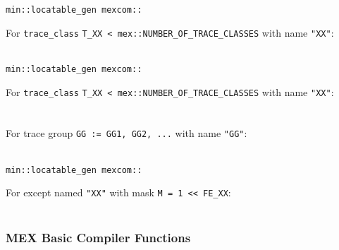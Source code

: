 \documentclass[12pt]{article}
\begin{document}
\verb|min::locatable_gen mexcom::| 
\begin{indpar}
For {\tt trace\_class} {\tt T\_XX < mex::NUMBER\_OF\_TRACE\_CLASSES}
with name {\tt "XX"}:\\
\hspace*{3em}{\tt ~~~min::get ( trace\_class\_table, new\_str\_gen ( "XX" ) )}
\\
\hspace*{3em}{\tt == new\_num\_gen ( T\_XX )}
\end{indpar}

\verb|min::locatable_gen mexcom::| 
\begin{indpar}
For {\tt trace\_class} {\tt T\_XX < mex::NUMBER\_OF\_TRACE\_CLASSES}
with name {\tt "XX"}:\\
\hspace*{3em}{\tt ~~~min::get ( trace\_class\_table, new\_str\_gen ( "XX" ) )}
\\
 \\
For trace group {\tt GG := GG1, GG2, ...}
with name {\tt "GG"}:\\
\hspace*{3em}{\tt ~~~min::get ( trace\_group\_table, new\_str\_gen ( "GG" ) )}
\\
\end{indpar}

\verb|min::locatable_gen mexcom::| 
\begin{indpar}
For except named {\tt "XX"} with mask {\tt M = 1 <{}< FE\_XX}: \\
\hspace*{3em}{\tt ~~~min::get ( except\_mask\_table, new\_str\_gen ( "XX" ) )}
\\
\hspace*{3em}{\tt == new\_num\_gen ( M )}
\end{indpar}

\subsubsection{MEX Basic Compiler Functions}
\label{MEX-BASIC-COMPILER-FUNCTIONS}
\end{document}
